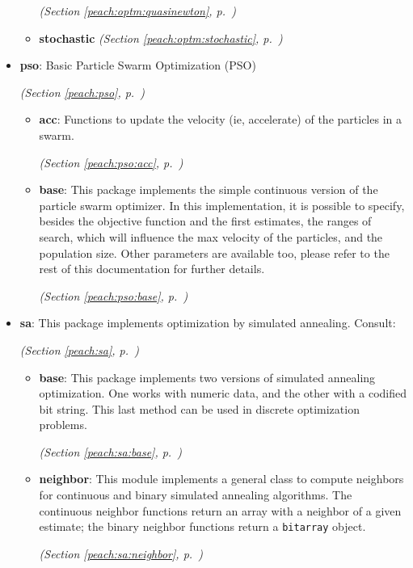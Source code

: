 \begin{itemize}
\begin{itemize}
  \textit{(Section \ref{peach:optm:quasinewton}, p.~\pageref{peach:optm:quasinewton})}

    \item \textbf{stochastic}
  \textit{(Section \ref{peach:optm:stochastic}, p.~\pageref{peach:optm:stochastic})}

  \end{itemize}
\item \textbf{pso}: 
Basic Particle Swarm Optimization (PSO)


  \textit{(Section \ref{peach:pso}, p.~\pageref{peach:pso})}

  \begin{itemize}
\setlength{\parskip}{0ex}
    \item \textbf{acc}: 
Functions to update the velocity (ie, accelerate) of the particles in a swarm.


  \textit{(Section \ref{peach:pso:acc}, p.~\pageref{peach:pso:acc})}

    \item \textbf{base}: 
This package implements the simple continuous version of the particle swarm
optimizer. In this implementation, it is possible to specify, besides the
objective function and the first estimates, the ranges of search, which will
influence the max velocity of the particles, and the population size. Other
parameters are available too, please refer to the rest of this documentation for
further details.


  \textit{(Section \ref{peach:pso:base}, p.~\pageref{peach:pso:base})}

  \end{itemize}
\item \textbf{sa}: 
This package implements optimization by simulated annealing. Consult:


  \textit{(Section \ref{peach:sa}, p.~\pageref{peach:sa})}

  \begin{itemize}
\setlength{\parskip}{0ex}
    \item \textbf{base}: 
This package implements two versions of simulated annealing optimization. One
works with numeric data, and the other with a codified bit string. This last
method can be used in discrete optimization problems.


  \textit{(Section \ref{peach:sa:base}, p.~\pageref{peach:sa:base})}

    \item \textbf{neighbor}: 
This module implements a general class to compute neighbors for continuous and
binary simulated annealing algorithms. The continuous neighbor functions return
an array with a neighbor of a given estimate; the binary neighbor functions
return a \texttt{bitarray} object.


  \textit{(Section \ref{peach:sa:neighbor}, p.~\pageref{peach:sa:neighbor})}

  \end{itemize}
\end{itemize}

